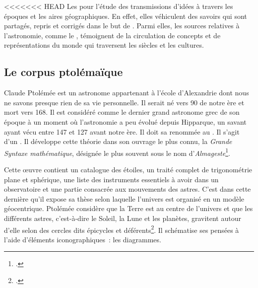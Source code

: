 <<<<<<< HEAD
Les  pour l'étude des transmissions d'idées à travers les époques et les aires géographiques.
En effet, elles véhiculent des savoirs qui sont partagés, repris et corrigés dans le but de .
Parmi elles, les sources relatives à l'astronomie, comme le , témoignent de la circulation de concepts et de représentations du monde qui traversent les siècles et les cultures.

\subsection{Le corpus ptolémaïque}


Claude Ptolémée est un astronome appartenant à l'école d'Alexandrie dont nous ne savons presque rien de sa vie personnelle.
Il serait né vers 90 de notre ère et mort vers 168.
Il est considéré comme le dernier grand astronome grec de son époque à un moment où l'astronomie a peu évolué depuis Hipparque, un savant ayant vécu entre 147 et 127 avant notre ère.
Il doit sa renommée au .
Il s'agit d'un .
Il développe cette théorie dans son ouvrage le plus connu, la \textit{Grande Syntaxe mathématique}, désignée le plus souvent sous le nom d'\textit{Almageste}\footcite{verdetLaubeLastronomieLaurore1990}.


Cette œuvre contient un catalogue des étoiles, un traité complet de trigonométrie plane et sphérique, une liste des instruments essentiels à avoir dans un observatoire et une partie consacrée aux mouvements des astres.
C'est dans cette dernière qu'il expose sa thèse selon laquelle l'univers est organisé en un modèle géocentrique.
Ptolémée considère que la Terre est au centre de l'univers et que les différents astres, c'est-à-dire le Soleil, la Lune et les planètes, gravitent autour d'elle selon des cercles dits épicycles et déférents\footcite{costabelCLAUDEPTOLEMEE90}.
Il schématise ses pensées à l'aide d'éléments iconographiques~: les diagrammes.


